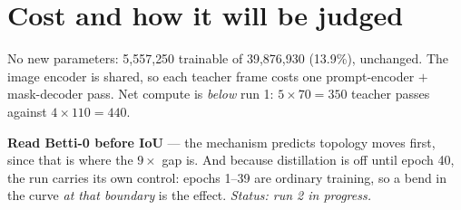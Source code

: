 \documentclass[9pt,a4paper]{extarticle}
\begin{document}
\section{Cost and how it will be judged}
No new parameters: 5{,}557{,}250 trainable of 39{,}876{,}930 (13.9\%), unchanged. The image encoder is shared, so
each teacher frame costs one prompt-encoder $+$ mask-decoder pass. Net compute is \emph{below} run 1:
$5\times70 = 350$ teacher passes against $4\times110 = 440$.

\textbf{Read Betti-0 before IoU} --- the mechanism predicts topology moves first, since that is where the $9\times$
gap is. And because distillation is off until epoch 40, the run carries its own control: epochs 1--39 are ordinary
training, so a bend in the curve \emph{at that boundary} is the effect. \emph{Status: run 2 in progress.}
\end{document}
